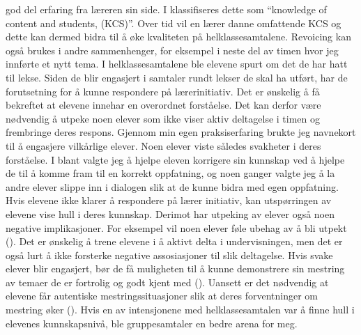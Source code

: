 \documentclass[12pt,twoside,onecolumn,norsk]{article}
\begin{document}
god del erfaring fra læreren sin side. I  klassifiseres dette som 
``knowledge of content and students, (KCS)''. Over tid vil en lærer danne omfattende KCS 
og dette kan dermed bidra til å øke kvaliteten på helklassesamtalene. Revoicing kan også 
brukes i andre sammenhenger, for eksempel i neste del av timen hvor jeg innførte et nytt tema.
\newline
\newline
I helklassesamtalene ble elevene spurt om det de har hatt til lekse. Siden de blir engasjert i 
samtaler rundt lekser de skal ha utført, har de forutsetning for å kunne respondere på lærerinitiativ. 
Det er ønskelig å få bekreftet at elevene innehar en overordnet forståelse. Det kan derfor være
nødvendig å utpeke noen elever som ikke viser aktiv deltagelse i timen og frembringe deres respons. 
Gjennom min egen praksiserfaring brukte jeg navnekort til å engasjere vilkårlige elever. Noen elever 
viste således svakheter i deres forståelse. I blant valgte jeg å hjelpe eleven korrigere sin 
kunnskap ved å hjelpe de til å komme fram til en korrekt oppfatning, og noen ganger valgte jeg å 
la andre elever slippe inn i dialogen slik at de kunne bidra med egen oppfatning.
\newline
\newline
Hvis elevene ikke klarer å respondere på lærer initiativ, kan utspørringen av elevene vise hull i 
deres kunnskap. Derimot har utpeking av elever også noen negative implikasjoner. For eksempel vil 
noen elever føle ubehag av å bli utpekt (). Det er ønskelig å trene elevene 
i å aktivt delta i undervisningen, men det er også lurt å ikke forsterke negative assosiasjoner til 
slik deltagelse. Hvis svake elever blir engasjert, bør de få muligheten til å kunne demonstrere 
sin mestring av temaer de er fortrolig og godt kjent med (). Uansett er det nødvendig 
at elevene får autentiske mestringssituasjoner slik at deres forventninger om mestring øker 
(). Hvis en av intensjonene med helklassesamtalen var å finne hull i 
elevenes kunnskapsnivå, ble gruppesamtaler en bedre arena for meg.
\end{document}
